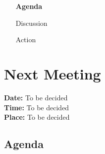 \documentclass[a4paper,11pt]{article}
\newcounter{magicrownumbers}
\newcommand \nextnumber{\stepcounter{magicrownumbers}\arabic{magicrownumbers}} %
\begin{document}
\begin{itemize}
	\item [\textbf{Agenda \nextnumber }] 
	\item [Discussion]  	
	
	\item [Action] 
\end{itemize}



  
\section{Next Meeting}
		\textbf{Date:} To be decided\\
		\textbf{Time:} To be decided \\
		\textbf{Place:} To be decided\\
	
	\subsection{Agenda}
				
\begin{thebibliography}{99}
\end{thebibliography}	
		
\end{document}
